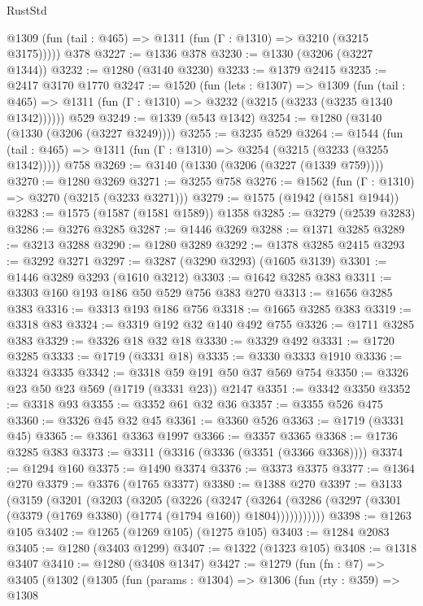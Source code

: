 \begin{lexlean}{RustStd}
\begin{coremodule}
{\begin{coremodule}
{{{{{{{{{{{{      @1309 (fun (tail : @465) => @1311 (fun (Γ : @1310) => @3210 (@3215 @3175)))))
    @378
@3227 := @1336 @378
@3230 := @1330 (@3206 (@3227 @1344))
@3232 := @1280 (@3140 @3230)
@3233 := @1379 @2415
@3235 := @2417 @3170 @1770
@3247 := @1520
    (fun (lets : @1307) =>
    @1309
      (fun (tail : @465) => @1311 (fun (Γ : @1310) => @3232 (@3215 (@3233 (@3235 @1340 @1342))))))
    @529
@3249 := @1339 (@543 @1342)
@3254 := @1280 (@3140 (@1330 (@3206 (@3227 @3249))))
@3255 := @3235 @529
@3264 := @1544
    (fun (tail : @465) => @1311 (fun (Γ : @1310) => @3254 (@3215 (@3233 (@3255 @1342)))))
    @758
@3269 := @3140 (@1330 (@3206 (@3227 (@1339 @759))))
@3270 := @1280 @3269
@3271 := @3255 @758
@3276 := @1562 (fun (Γ : @1310) => @3270 (@3215 (@3233 @3271)))
@3279 := @1575 (@1942 (@1581 @1944))
@3283 := @1575 (@1587 (@1581 @1589)) @1358
@3285 := @3279 (@2539 @3283)
@3286 := @3276 @3285
@3287 := @1446 @3269
@3288 := @1371 @3285
@3289 := @3213 @3288
@3290 := @1280 @3289
@3292 := @1378 @3285 @2415
@3293 := @3292 @3271
@3297 := @3287 (@3290 @3293) (@1605 @3139)
@3301 := @1446 @3289 @3293 (@1610 @3212)
@3303 := @1642 @3285 @383
@3311 := @3303 @160 @193 @186 @50 @529 @756 @383 @270
@3313 := @1656 @3285 @383
@3316 := @3313 @193 @186 @756
@3318 := @1665 @3285 @383
@3319 := @3318 @83
@3324 := @3319 @192 @32 @140 @492 @755
@3326 := @1711 @3285 @383
@3329 := @3326 @18 @32 @18
@3330 := @3329 @492
@3331 := @1720 @3285
@3333 := @1719 (@3331 @18)
@3335 := @3330 @3333 @1910
@3336 := @3324 @3335
@3342 := @3318 @59 @191 @50 @37 @569 @754
@3350 := @3326 @23 @50 @23 @569 (@1719 (@3331 @23)) @2147
@3351 := @3342 @3350
@3352 := @3318 @93
@3355 := @3352 @61 @32 @36
@3357 := @3355 @526 @475
@3360 := @3326 @45 @32 @45
@3361 := @3360 @526
@3363 := @1719 (@3331 @45)
@3365 := @3361 @3363 @1997
@3366 := @3357 @3365
@3368 := @1736 @3285 @383
@3373 := @3311 (@3316 (@3336 (@3351 (@3366 @3368))))
@3374 := @1294 @160
@3375 := @1490 @3374
@3376 := @3373 @3375
@3377 := @1364 @270
@3379 := @3376 (@1765 @3377)
@3380 := @1388 @270
@3397 := @3133
    (@3159
      (@3201
        (@3203
          (@3205
            (@3226
              (@3247
                (@3264
                  (@3286 (@3297 (@3301 (@3379 (@1769 @3380) (@1774 (@1794 @160)) @1804)))))))))))
@3398 := @1263 @105
@3402 := @1265 (@1269 @105) (@1275 @105)
@3403 := @1284 @2083
@3405 := @1280 (@3403 @1299)
@3407 := @1322 (@1323 @105)
@3408 := @1318 @3407
@3410 := @1280 (@3408 @1347)
@3427 := @1279
    (fun (fn : @7) =>
    @3405
      (@1302
        (@1305
          (fun (params : @1304) =>
          @1306
            (fun (rty : @359) =>
            @1308
}}}}}}}}}}}}
\end{coremodule}}
\end{coremodule}
\end{lexlean}
